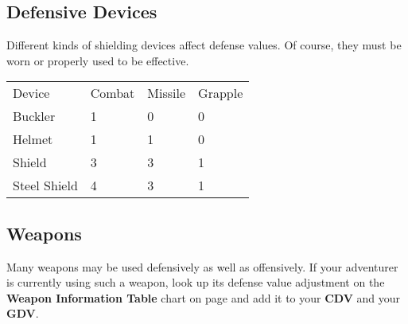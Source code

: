 \begin{multicols*}{2}
\subsection{Defensive Devices}
Different kinds of shielding devices affect defense values. Of course, they must be worn or properly used to be effective.
\begin{tcolorbox}[breakable,boxrule=0pt]
\begin{tabular}{l l l l}
Device & Combat & Missile & Grapple\\
Buckler & 1 & 0 & 0\\
Helmet & 1 & 1 & 0\\
Shield & 3 & 3 & 1\\
Steel Shield & 4 & 3 & 1\\
\end{tabular}
\end{tcolorbox}
\subsection{Weapons}
Many weapons may be used defensively as well as offensively. If your adventurer is currently using such a weapon, look up its defense value adjustment on the \textbf{Weapon Information Table} chart on page \pageref{playing-weapon-table} and add it to your \textbf{CDV} and your \textbf{GDV}.
\end{multicols*}